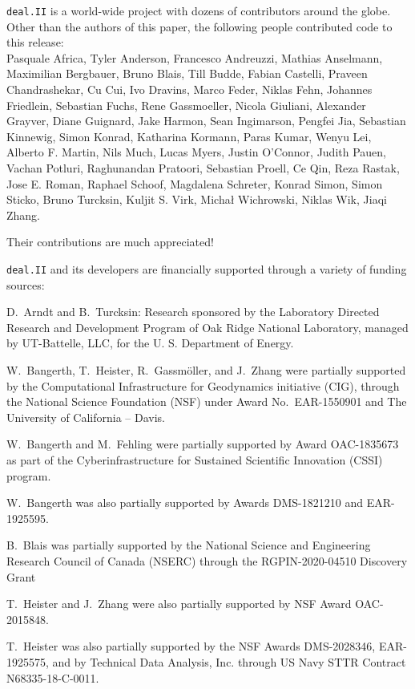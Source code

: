 \documentclass{ansarticle-preprint}
\newcommand{\specialword}[1]{\texttt{#1}}
\newcommand{\dealii}{{\specialword{deal.II}}\xspace}
\begin{document}
\dealii{} is a world-wide project with dozens of contributors around the
globe. Other than the authors of this paper, the following people
contributed code to this release:\\
%
%
Pasquale	Africa,
Tyler	Anderson,
Francesco	Andreuzzi,
Mathias	Anselmann,
Maximilian	Bergbauer,
Bruno	Blais,
Till	Budde,
Fabian	Castelli,
Praveen	Chandrashekar,
Cu	Cui,
Ivo	Dravins,
Marco	Feder,
Niklas	Fehn,
Johannes	Friedlein,
Sebastian	Fuchs,
Rene	Gassmoeller,
Nicola	Giuliani,
Alexander	Grayver,
Diane	Guignard,
Jake	Harmon,
Sean	Ingimarson,
Pengfei	Jia,
Sebastian	Kinnewig,
Simon	Konrad,
Katharina	Kormann,
Paras	Kumar,
Wenyu	Lei,
Alberto F.	Martin,
Nils	Much,
Lucas	Myers,
Justin	O'Connor,
Judith	Pauen,
Vachan	Potluri,
Raghunandan	Pratoori,
Sebastian	Proell,
Ce	Qin,
Reza	Rastak,
Jose E.	Roman,
Raphael	Schoof,
Magdalena	Schreter,
Konrad	Simon,
Simon	Sticko,
Bruno	Turcksin,
Kuljit S.	Virk,
Michał	Wichrowski,
Niklas Wik,
Jiaqi	Zhang.


Their contributions are much appreciated!


\bigskip

\dealii{} and its developers are financially supported through a
variety of funding sources:

D.~Arndt and B.~Turcksin: Research sponsored by the Laboratory Directed Research and
Development Program of Oak Ridge National Laboratory, managed by UT-Battelle,
LLC, for the U. S. Department of Energy.

W.~Bangerth, T.~Heister, R.~Gassm{\"o}ller, and J.~Zhang were partially
supported by the Computational Infrastructure for Geodynamics initiative
(CIG), through the National Science Foundation (NSF) under Award
No.~EAR-1550901 and The University of California -- Davis.

W.~Bangerth and M.~Fehling were partially supported by Award OAC-1835673
as part of the Cyberinfrastructure for Sustained Scientific Innovation (CSSI)
program.

W.~Bangerth was also partially supported by Awards DMS-1821210 and EAR-1925595.

B.~Blais was partially supported by the National Science and Engineering
Research Council of Canada (NSERC)  through the RGPIN-2020-04510 Discovery
Grant

T.~Heister and J.~Zhang were also partially supported by NSF
Award OAC-2015848.

T.~Heister was also partially supported by the NSF Awards DMS-2028346,
EAR-1925575, and by Technical Data Analysis, Inc. through US Navy STTR
Contract N68335-18-C-0011.
\end{document}
